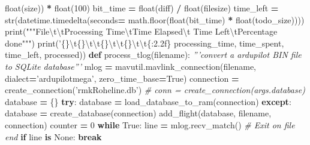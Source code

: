 \documentclass[12pt,oneside]{reedthesis}
\newenvironment{Shaded}{\begin{snugshade}}{\end{snugshade}}
\newcommand{\KeywordTok}[1]{\textcolor[rgb]{0.13,0.29,0.53}{\textbf{#1}}}
\newcommand{\DecValTok}[1]{\textcolor[rgb]{0.00,0.00,0.81}{#1}}
\newcommand{\CharTok}[1]{\textcolor[rgb]{0.31,0.60,0.02}{#1}}
\newcommand{\SpecialCharTok}[1]{\textcolor[rgb]{0.00,0.00,0.00}{#1}}
\newcommand{\StringTok}[1]{\textcolor[rgb]{0.31,0.60,0.02}{#1}}
\newcommand{\CommentTok}[1]{\textcolor[rgb]{0.56,0.35,0.01}{\textit{#1}}}
\newcommand{\VariableTok}[1]{\textcolor[rgb]{0.00,0.00,0.00}{#1}}
\newcommand{\ControlFlowTok}[1]{\textcolor[rgb]{0.13,0.29,0.53}{\textbf{#1}}}
\newcommand{\OperatorTok}[1]{\textcolor[rgb]{0.81,0.36,0.00}{\textbf{#1}}}
\newcommand{\BuiltInTok}[1]{#1}
\newcommand{\NormalTok}[1]{#1}
\theoremstyle{definition}
\theoremstyle{definition}
\theoremstyle{definition}
\theoremstyle{remark}
\begin{document}
\begin{Shaded}
\begin{Highlighting}[]
                  \BuiltInTok{float}\NormalTok{(size)) }\OperatorTok{*} \BuiltInTok{float}\NormalTok{(}\DecValTok{100}\NormalTok{)}
\NormalTok{                bit_time }\OperatorTok{=} \BuiltInTok{float}\NormalTok{(diff) }\OperatorTok{/} \BuiltInTok{float}\NormalTok{(filesize)}
\NormalTok{                time_left }\OperatorTok{=} \BuiltInTok{str}\NormalTok{(datetime.timedelta(seconds}\OperatorTok{=}
\NormalTok{                  math.floor(}\BuiltInTok{float}\NormalTok{(bit_time) }\OperatorTok{*} \BuiltInTok{float}\NormalTok{(todo_size))))}
                \BuiltInTok{print}\NormalTok{(}\StringTok{"""File}\CharTok{\textbackslash{}t\textbackslash{}t}\StringTok{Processing Time}\CharTok{\textbackslash{}t}\StringTok{Time Elapsed}\CharTok{\textbackslash{}t}
\StringTok{                  Time Left}\CharTok{\textbackslash{}t}\StringTok{Percentage done"""}\NormalTok{)}
                \BuiltInTok{print}\NormalTok{(}\StringTok{'}\SpecialCharTok{\{\}}\CharTok{\textbackslash{}t}\SpecialCharTok{\{\}}\CharTok{\textbackslash{}t\textbackslash{}t}\SpecialCharTok{\{\}}\CharTok{\textbackslash{}t\textbackslash{}t}\SpecialCharTok{\{\}}\CharTok{\textbackslash{}t\textbackslash{}t}\SpecialCharTok{\{:2.2f\}}\StringTok{%
\NormalTok{                  processing_time, time_spent, time_left, processed))}
\KeywordTok{def}\NormalTok{ process_tlog(filename):}
    \CommentTok{'''convert a ardupilot BIN file to SQLite database'''}
\NormalTok{    mlog }\OperatorTok{=}\NormalTok{ mavutil.mavlink_connection(filename, dialect}\OperatorTok{=}\StringTok{'ardupilotmega'}\NormalTok{, }
\NormalTok{      zero_time_base}\OperatorTok{=}\VariableTok{True}\NormalTok{)}
\NormalTok{    connection }\OperatorTok{=}\NormalTok{ create_connection(}\StringTok{'rmkRoheline.db'}\NormalTok{)}
    \CommentTok{# conn = create_connection(args.database)}
\NormalTok{    database }\OperatorTok{=}\NormalTok{ \{\}}
    \ControlFlowTok{try}\NormalTok{:}
\NormalTok{        database }\OperatorTok{=}\NormalTok{ load_database_to_ram(connection)}
    \ControlFlowTok{except}\NormalTok{:}
\NormalTok{        database }\OperatorTok{=}\NormalTok{ create_database(connection)}
\NormalTok{    add_flight(database, filename, connection)}
\NormalTok{    counter }\OperatorTok{=} \DecValTok{0}
    \ControlFlowTok{while} \VariableTok{True}\NormalTok{:}
\NormalTok{        line }\OperatorTok{=}\NormalTok{ mlog.recv_match()}
        \CommentTok{# Exit on file end}
        \ControlFlowTok{if}\NormalTok{ line }\KeywordTok{is} \VariableTok{None}\NormalTok{:}
            \ControlFlowTok{break}
}
\end{Highlighting}
\end{Shaded}
\end{document}
